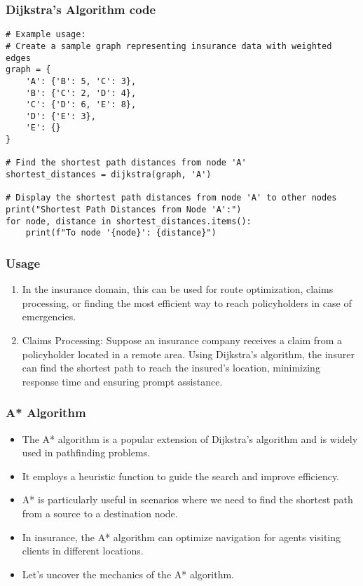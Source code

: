 \begin{frame}[fragile]\frametitle{Dijkstra's Algorithm code}

\begin{lstlisting}[basicstyle=\tiny]
# Example usage:
# Create a sample graph representing insurance data with weighted edges
graph = {
    'A': {'B': 5, 'C': 3},
    'B': {'C': 2, 'D': 4},
    'C': {'D': 6, 'E': 8},
    'D': {'E': 3},
    'E': {}
}

# Find the shortest path distances from node 'A'
shortest_distances = dijkstra(graph, 'A')

# Display the shortest path distances from node 'A' to other nodes
print("Shortest Path Distances from Node 'A':")
for node, distance in shortest_distances.items():
    print(f"To node '{node}': {distance}")

\end{lstlisting}
\end{frame}

\begin{frame}[fragile]\frametitle{Usage}
\begin{enumerate}
\item In the insurance domain, this can be used for route optimization, claims processing, or finding the most efficient way to reach policyholders in case of emergencies.
\item  Claims Processing: Suppose an insurance company receives a claim from a policyholder located in a remote area. Using Dijkstra's algorithm, the insurer can find the shortest path to reach the insured's location, minimizing response time and ensuring prompt assistance.
\end{enumerate}
\end{frame}



\begin{frame}[fragile]\frametitle{A* Algorithm}
\begin{itemize}
\item The A* algorithm is a popular extension of Dijkstra's algorithm and is widely used in pathfinding problems.
\item It employs a heuristic function to guide the search and improve efficiency.
\item A* is particularly useful in scenarios where we need to find the shortest path from a source to a destination node.
\item In insurance, the A* algorithm can optimize navigation for agents visiting clients in different locations.
\item Let's uncover the mechanics of the A* algorithm.
\end{itemize}
\end{frame}


